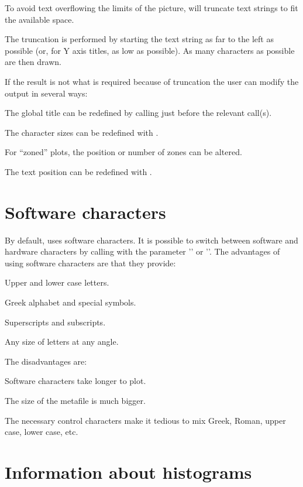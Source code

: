 To avoid text overflowing the limits of the picture, \HPLOT{} will truncate text
strings to fit the available space.

The truncation is performed by starting the text string as far to the left as
possible (or, for Y axis titles, as low as possible). As many characters as 
possible are then drawn.

If the result is not what is required because of truncation the user can modify
the output in several ways:
\begin{UL}
\item The \HBOOK{} global title can be redefined by calling  just
      before the relevant \HPLOT{} call(s).
\item The character sizes can be redefined with .
\item For ``zoned'' plots, the position or number of zones can be altered.
\item The text position can be redefined with .
\end{UL}

\section{Software characters}

By default, \HPLOT{} uses software characters. It is possible to switch between
software and hardware characters by calling  with the parameter 
'' or ''. The advantages of using software characters are
that they provide:
\begin{UL}
\item Upper and lower case letters.
\item Greek alphabet and special symbols.
\item Superscripts and subscripts.
\item Any size of letters at any angle.
\end{UL}
The disadvantages are:
\begin{UL}
\item Software characters take longer to plot.
\item The size of the \GKS{} metafile is much bigger.
\item The necessary control characters make it tedious to mix Greek, Roman,
      upper case, lower case, etc.
\end{UL}

\section{Information about histograms}

